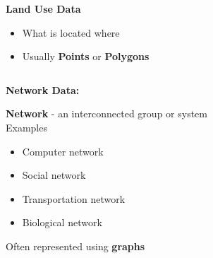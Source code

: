 \documentclass[aspectratio=169]{beamer}
\begin{document}
\begin{frame}
	
	\textbf{Land Use Data}
	
	\begin{itemize}
		\item What is located where
		\item Usually \textbf{Points} or \textbf{Polygons}
	\end{itemize}
	
	
\end{frame}



	
	


\begin{frame}
	
	\begin{columns}
		\begin{column}{0.5\textwidth}
			
			\textbf{Network Data:}
			
			\vspace{6mm}
			
			\textbf{Network} - an interconnected group or system \\
			\vspace{3mm}
			Examples
			\begin{itemize}
				\item Computer network
				\item Social network
				\item Transportation network
				\item Biological network
			\end{itemize} \vspace{3mm}
			Often represented using \textbf{graphs}
		\end{column}
		

\end{columns}
\end{frame}
\end{document}
